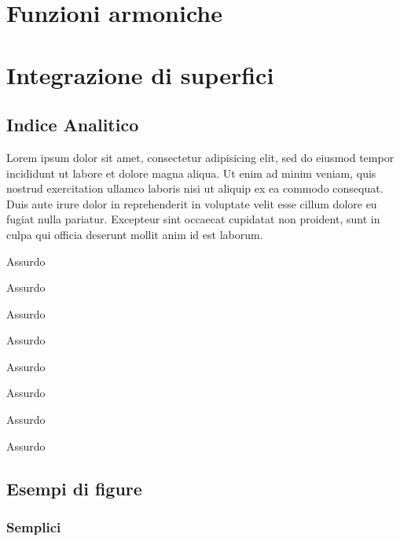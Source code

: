 \documentclass[a4paper, 12pt]{report}
\begin{document}

\chapter{Funzioni armoniche}


\chapter{Integrazione di superfici}



\newpage

\section{Indice Analitico}

Lorem ipsum dolor sit amet, consectetur adipisicing elit, sed do eiusmod
tempor incididunt ut labore et dolore magna aliqua. Ut enim ad minim veniam,
quis nostrud exercitation ullamco laboris nisi ut aliquip ex ea commodo
consequat. Duis aute irure dolor in reprehenderit in voluptate velit esse
cillum dolore eu fugiat nulla pariatur. Excepteur sint occaecat cupidatat non
proident, sunt in culpa qui officia deserunt mollit anim id est laborum.

\begin{multicols*}{2}

\makebox[3cm][l]{\absurd} Assurdo

\makebox[3cm][l]{\absurd} Assurdo

\makebox[3cm][l]{\absurd} Assurdo

\makebox[3cm][l]{\absurd} Assurdo

\vfill\null\columnbreak

\makebox[3cm][l]{\absurd} Assurdo

\makebox[3cm][l]{\absurd} Assurdo

\makebox[3cm][l]{\absurd} Assurdo

\makebox[3cm][l]{\absurd} Assurdo

\end{multicols*}

\section*{Esempi di figure}

\subsection*{Semplici}
\end{document}
